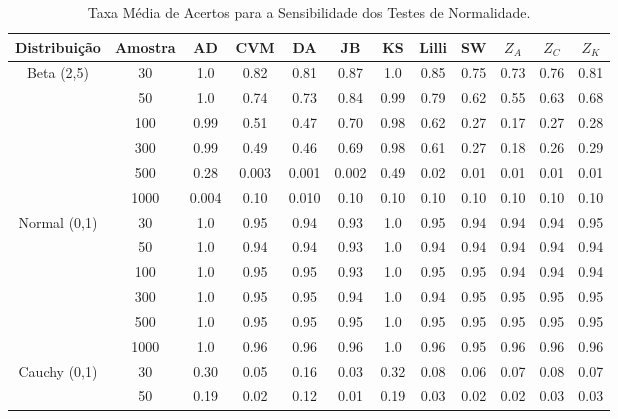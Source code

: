 \documentclass[final]{beamer}
\begin{document}
\begin{frame}[t]
\begin{columns}[t,totalwidth=0.6\paperwidth]
\begin{column}{0.45\paperwidth}
\begin{table}[H]
    \centering
    \caption{Taxa Média de Acertos para a Sensibilidade dos Testes de Normalidade.}
    \begin{tabular}{c|c|c|c|c|c|c|c|c|c|c|c}
    \hline \hline
     Distribuição & Amostra &   AD  & CVM  &  DA   & JB   &  KS   & Lilli &  SW  & $Z_{A}$ & $Z_{C}$ & $Z_{K}$ \\
    \hline
\multirow{6}{*}{Beta (2,5)} 
                & 30    & 1.0   & 0.82 & 0.81  & 0.87 &  1.0  &  0.85  &  0.75 &  0.73  & 0.76   & 0.81   \\
                & 50    & 1.0   & 0.74 & 0.73  & 0.84 &  0.99 &  0.79  &  0.62 &  0.55  & 0.63   & 0.68   \\
                & 100   & 0.99  & 0.51 & 0.47  & 0.70 &  0.98 &  0.62  &  0.27 &  0.17  & 0.27   & 0.28   \\
                & 300   & 0.99  & 0.49 & 0.46  & 0.69 &  0.98 &  0.61  &  0.27 &  0.18  & 0.26   & 0.29    \\
                & 500   & 0.28  & 0.003 & 0.001  & 0.002 & 0.49  & 0.02 & 0.01  & 0.01  & 0.01   & 0.01     \\
                & 1000  & 0.004  & 0.10  & 0.010  & 0.10 & 0.10  & 0.10  & 0.10  & 0.10  & 0.10  & 0.10       \\
\hline\hline
\multirow{6}{*}{Normal (0,1)}   
               & 30     & 1.0   & 0.95  &  0.94 & 0.93 &  1.0  &  0.95  & 0.94  &  0.94  &  0.94  & 0.95   \\
               &  50    & 1.0   & 0.94  &  0.94 & 0.93 &  1.0  &  0.94  & 0.94  &  0.94  &  0.94  & 0.94    \\
               & 100    & 1.0   & 0.95  &  0.95 & 0.93 &  1.0  &  0.95  & 0.95  &  0.94  &  0.94  & 0.94   \\
               & 300    & 1.0   & 0.95  &  0.95 & 0.94 &  1.0  &  0.94  & 0.95  &  0.95  &  0.95  & 0.95    \\
               & 500    & 1.0   & 0.95  &  0.95 & 0.95 &  1.0  &  0.95  & 0.95  &  0.95  &  0.95  & 0.95    \\
               & 1000   & 1.0   & 0.96  &  0.96 & 0.96 &  1.0  &  0.96  & 0.95  &  0.96  &  0.96  & 0.96     \\  
\hline\hline
\multirow{6}{*}{Cauchy (0,1)}     
               & 30     &  0.30 & 0.05  &  0.16 & 0.03 & 0.32  & 0.08  & 0.06  & 0.07   & 0.08   & 0.07    \\
               & 50     &  0.19 & 0.02  &  0.12 & 0.01 & 0.19  & 0.03  & 0.02  & 0.02   & 0.03   & 0.03   \\

\end{tabular}
\end{table}
\end{column}
\end{columns}
\end{frame}
\end{document}
